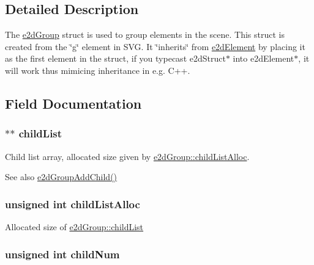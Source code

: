 \subsection{Detailed Description}
The \hyperlink{structe2dGroup}{e2d\-Group} struct is used to group elements in the scene. This struct is created from the \char`\"{}g\char`\"{} element in S\-V\-G. It \char`\"{}inherits\char`\"{} from \hyperlink{structe2dElement}{e2d\-Element} by placing it as the first element in the struct, if you typecast e2d\-Struct$\ast$ into e2d\-Element$\ast$, it will work thus mimicing inheritance in e.\-g. C++. 

\subsection{Field Documentation}
\hypertarget{structe2dGroup_a55f6dde874716dc99dcd270fc0999a01}{
\subsubsection[{child\-List}]{$\ast$$\ast$ {\bf child\-List}}}\label{structe2dGroup_a55f6dde874716dc99dcd270fc0999a01}
Child list array, allocated size given by \hyperlink{structe2dGroup_a9c89d7cf35b835ef1917855c78a79cc5}{e2d\-Group\-::child\-List\-Alloc}. \begin{DoxySeeAlso}{See also}
\hyperlink{group__e2dGroup_ga6ae76730f78ad731621e9286a3980b8a}{e2d\-Group\-Add\-Child()} 
\end{DoxySeeAlso}
\hypertarget{structe2dGroup_a9c89d7cf35b835ef1917855c78a79cc5}{
\subsubsection[{child\-List\-Alloc}]{\setlength{\rightskip}{0pt plus 5cm}unsigned int {\bf child\-List\-Alloc}}}\label{structe2dGroup_a9c89d7cf35b835ef1917855c78a79cc5}
Allocated size of \hyperlink{structe2dGroup_a55f6dde874716dc99dcd270fc0999a01}{e2d\-Group\-::child\-List} \hypertarget{structe2dGroup_a0af3697c2c9df6ed0ddd340cded35d65}{
\subsubsection[{child\-Num}]{\setlength{\rightskip}{0pt plus 5cm}unsigned int {\bf child\-Num}}}\label{structe2dGroup_a0af3697c2c9df6ed0ddd340cded35d65}
